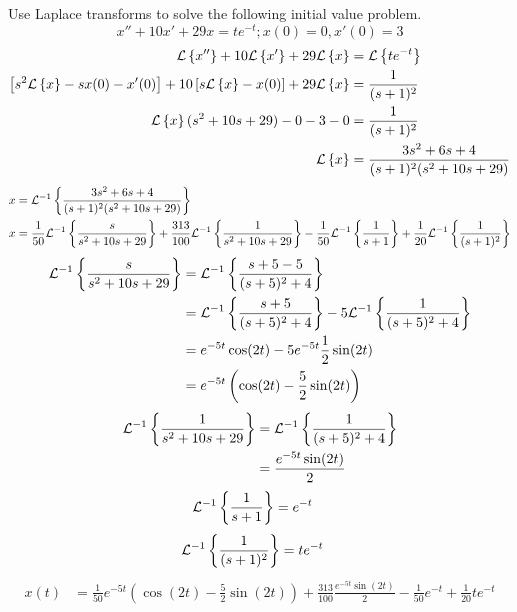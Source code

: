\documentclass{article}
\begin{document}
Use Laplace transforms to solve the following initial value problem.
\begin{equation*}
	x'' + 10x' + 29x = te^{-t}; x(0) = 0, x'(0) = 3
\end{equation*}
\begin{align*}
	\lap[x''] + 10\lap[x'] + 29\lap[x] & = \lap[te^{-t}] \\
	\left[ s^2\lap[x] - sx(0) - x'(0) \right] + 10 \left[ s\lap[x] - x(0) \right] + 29\lap[x] & = \frac{1}{(s + 1)^{2}} \\
	\lap[x](s^2 + 10s + 29) - 0 - 3 - 0 & = \frac{1}{(s + 1)^2} \\
	\lap[x] & = \frac{3s^2 + 6s + 4}{(s + 1)^2(s^2 + 10s + 29)}
\end{align*}
\begin{align*}
	x & = \ilap[\frac{3s^2 + 6s + 4}{(s + 1)^2(s^2 + 10s + 29)}] \\
	x & = \frac{1}{50}\ilap[\frac{s}{s^2 + 10s + 29}] + \frac{313}{100}\ilap[\frac{1}{s^2 + 10s + 29}] - \frac{1}{50}\ilap[\frac{1}{s + 1}] + \frac{1}{20}\ilap[\frac{1}{(s + 1)^2}]
\end{align*}
\begin{align*}
	\ilap[\frac{s}{s^2 + 10s + 29}] & = \ilap[\frac{s + 5 - 5}{(s + 5)^2 + 4}] \\
									& = \ilap[\frac{s + 5}{(s + 5)^2 + 4}] - 5\ilap[\frac{1}{(s + 5)^2 + 4}] \\
									& = e^{-5t}\cos(2t) - 5e^{-5t}\frac{1}{2}\sin(2t) \\
									& = e^{-5t} \left( \cos(2t) - \frac{5}{2}\sin(2t) \right)
\end{align*}
\begin{align*}
	\ilap[\frac{1}{s^2 + 10s + 29}] & = \ilap[\frac{1}{(s + 5)^2 + 4}] \\
									& = \frac{e^{-5t}\sin(2t)}{2}
\end{align*}
\begin{align*}
	\ilap[\frac{1}{s + 1}] & = e^{-t}
\end{align*}
\begin{align*}
	\ilap[\frac{1}{(s + 1)^2}] & = te^{-t}
\end{align*}
\begin{align*}
	x(t) & = \frac{1}{50}e^{-5t} \left( \cos(2t) - \frac{5}{2}\sin(2t) \right) + \frac{313}{100}\frac{e^{-5t}\sin(2t)}{2} - \frac{1}{50}e^{-t} + \frac{1}{20}te^{-t}
\end{align*}
\end{document}
